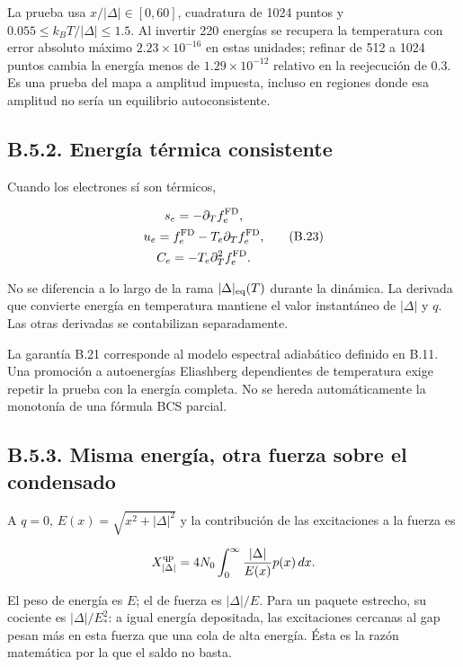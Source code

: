 \documentclass[
  spanish,
  10pt,
  a4paper,
]{article}
\begin{document}
La prueba usa \(x/|\Delta|\in[0,60]\), cuadratura de 1024 puntos y
\(0.055\leq k_BT/|\Delta|\leq1.5\). Al invertir 220 energías se recupera
la temperatura con error absoluto máximo \(2.23\times10^{-16}\) en estas
unidades; refinar de 512 a 1024 puntos cambia la energía menos de
\(1.29\times10^{-12}\) relativo en la reejecución de 0.3. Es una prueba
del mapa a amplitud impuesta, incluso en regiones donde esa amplitud no
sería un equilibrio autoconsistente.

\subsection{B.5.2. Energía térmica
consistente}\label{b.5.2.-energuxeda-tuxe9rmica-consistente}

Cuando los electrones sí son térmicos,

\[
\begin{gathered}
s_e=-\partial_T f_e^{\rm FD},\\
u_e=f_e^{\rm FD}-T_e\partial_Tf_e^{\rm FD},\\
C_e=-T_e\partial_T^2f_e^{\rm FD}.
\end{gathered} \tag{B.23}
\]

No se diferencia a lo largo de la rama \(|\Delta|_{\rm eq}(T)\) durante
la dinámica. La derivada que convierte energía en temperatura mantiene
el valor instantáneo de \(|\Delta|\) y \(q\). Las otras derivadas se
contabilizan separadamente.

La garantía B.21 corresponde al modelo espectral adiabático definido en
B.11. Una promoción a autoenergías Eliashberg dependientes de
temperatura exige repetir la prueba con la energía completa. No se
hereda automáticamente la monotonía de una fórmula BCS parcial.

\subsection{B.5.3. Misma energía, otra fuerza sobre el
condensado}\label{b.5.3.-misma-energuxeda-otra-fuerza-sobre-el-condensado}

A \(q=0\), \(E(x)=\sqrt{x^2+|\Delta|^2}\) y la contribución de las
excitaciones a la fuerza es

\[
X_{|\Delta|}^{\rm qp}=4N_0\int_0^\infty\frac{|\Delta|}{E(x)}p(x)\,dx.
\]

El peso de energía es \(E\); el de fuerza es \(|\Delta|/E\). Para un
paquete estrecho, su cociente es \(|\Delta|/E_*^2\): a igual energía
depositada, las excitaciones cercanas al gap pesan más en esta fuerza
que una cola de alta energía. Ésta es la razón matemática por la que el
saldo no basta.
\end{document}
